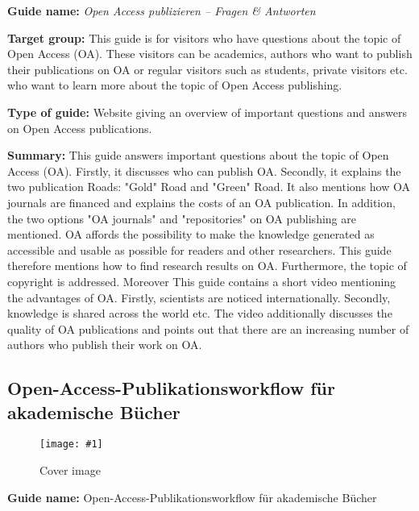 \documentclass{article}
\newlength{\imgwidth}
\newcommand\scaledgraphics[2]{%
                
\settowidth{\imgwidth}{\texttt{[image: \#1]}}%
                
\setlength{\imgwidth}{\minof{\imgwidth}{#2\textwidth}}%
                
\texttt{[image: \#1]}%
                
}
\begin{document}
\textbf{Guide name:} \emph{Open Access publizieren – Fragen \& Antworten} 

\autocite{bundesministerium_fur_bildung_und_forschung_open_2021}


\textbf{Target group: }This guide is for visitors who have questions about the topic of Open Access (OA). These visitors can be academics, authors who want to publish their publications on OA or regular visitors such as students, private visitors etc. who want to learn more about the topic of Open Access publishing.


\textbf{Type of guide: }Website giving an\textbf{ }overview of important questions and answers on Open Access publications.


\textbf{Summary: }This guide answers important questions about the topic of Open Access (OA). Firstly, it discusses who can publish OA. Secondly, it explains the two publication Roads: "Gold" Road and "Green" Road. It also mentions how OA journals are financed and explains the costs of an OA publication. In addition, the two options "OA journals" and "repositories" on OA publishing are mentioned. OA affords the possibility to make the knowledge generated as accessible and usable as possible for readers and other researchers. This guide therefore mentions how to find research results on OA. Furthermore, the topic of copyright is addressed. Moreover This guide contains a short video mentioning the advantages of OA. Firstly, scientists are noticed internationally. Secondly, knowledge is shared across the world etc. The video additionally discusses the quality of OA publications and points out that there are an increasing number of authors who publish their work on OA.


\subsection{Open-Access-Publikationsworkflow für akademische Bücher}\label{H6691479}



\begin{center}
\begin{figure}
\scaledgraphics{39363ae5-01d9-4e5a-a46f-bf20971df65a.jpg}{0.5}
\caption*{Cover image}\label{F7674061}
\end{figure}


\end{center}


\textbf{Guide name:} Open-Access-Publikationsworkflow für akademische Bücher \autocite{bohm_open-access-publikationsworkflow_2020}
\end{document}
